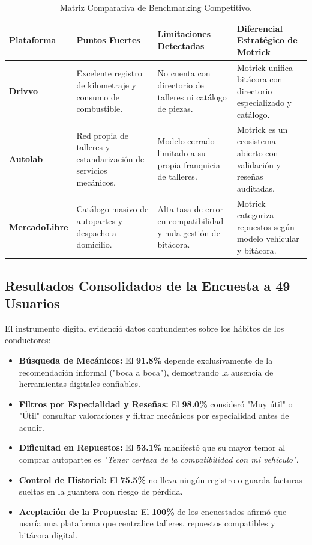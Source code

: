 \documentclass[11pt,letterpaper]{article}
\begin{document}
\begin{table}[h!]
\centering
\small
\begin{tabularx}{\textwidth}{p{2.5cm}XXp{4.2cm}}
\toprule
\textbf{Plataforma} & \textbf{Puntos Fuertes} & \textbf{Limitaciones Detectadas} & \textbf{Diferencial Estratégico de Motrick} \\
\midrule
\textbf{Drivvo} & Excelente registro de kilometraje y consumo de combustible. & No cuenta con directorio de talleres ni catálogo de piezas. & Motrick unifica bitácora con directorio especializado y catálogo. \\
\addlinespace
\textbf{Autolab} & Red propia de talleres y estandarización de servicios mecánicos. & Modelo cerrado limitado a su propia franquicia de talleres. & Motrick es un ecosistema abierto con validación y reseñas auditadas. \\
\addlinespace
\textbf{MercadoLibre} & Catálogo masivo de autopartes y despacho a domicilio. & Alta tasa de error en compatibilidad y nula gestión de bitácora. & Motrick categoriza repuestos según modelo vehicular y bitácora. \\
\bottomrule
\end{tabularx}
\caption{Matriz Comparativa de Benchmarking Competitivo.}
\end{table}

\subsection{Resultados Consolidados de la Encuesta a 49 Usuarios}
El instrumento digital evidenció datos contundentes sobre los hábitos de los conductores:
\begin{itemize}
    \item \textbf{Búsqueda de Mecánicos:} El \textbf{91.8\%} depende exclusivamente de la recomendación informal ("boca a boca"), demostrando la ausencia de herramientas digitales confiables.
    \item \textbf{Filtros por Especialidad y Reseñas:} El \textbf{98.0\%} consideró "Muy útil" o "Útil" consultar valoraciones y filtrar mecánicos por especialidad antes de acudir.
    \item \textbf{Dificultad en Repuestos:} El \textbf{53.1\%} manifestó que su mayor temor al comprar autopartes es \textit{"Tener certeza de la compatibilidad con mi vehículo"}.
    \item \textbf{Control de Historial:} El \textbf{75.5\%} no lleva ningún registro o guarda facturas sueltas en la guantera con riesgo de pérdida.
    \item \textbf{Aceptación de la Propuesta:} El \textbf{100\%} de los encuestados afirmó que usaría una plataforma que centralice talleres, repuestos compatibles y bitácora digital.
\end{itemize}
\end{document}
